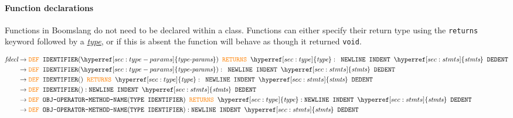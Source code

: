 \documentclass{article}
\begin{document}
\paragraph{Function declarations}
Functions in Boomslang do not need to be declared within a class. Functions can either specify their return type using the \texttt{returns} keyword followed by a \hyperref[sec:type]{\textit{type}}, or if this is absent the function will behave as though it returned \texttt{void}.

\label{sec:fdecl}
\begin{align*}
    \textit{fdecl} &\to \textcolor{orange}{\texttt{DEF}} \texttt{ } \texttt{IDENTIFIER}(\hyperref[sec:type-params]{\textit{type-params}}) \texttt{ } \textcolor{orange}{\texttt{RETURNS}} \texttt{ } \hyperref[sec:type]{\textit{type}}: \texttt{ } \texttt{NEWLINE} \texttt{ } \texttt{INDENT} \texttt{ } \hyperref[sec:stmts]{\textit{stmts}} \texttt{ } \texttt{DEDENT} \\
    &\to \textcolor{orange}{\texttt{DEF}} \texttt{ } \texttt{IDENTIFIER}(\hyperref[sec:type-params]{\textit{type-params}}): \texttt{ } \texttt{NEWLINE} \texttt{ } \texttt{INDENT} \texttt{ } \hyperref[sec:stmts]{\textit{stmts}} \texttt{ } \texttt{DEDENT} \\
    &\to \textcolor{orange}{\texttt{DEF}} \texttt{ } \texttt{IDENTIFIER}() \texttt{ } \textcolor{orange}{\texttt{RETURNS}} \texttt{ } \hyperref[sec:type]{\textit{type}}: \texttt{ } \texttt{NEWLINE} \texttt{ } \texttt{INDENT} \texttt{ } \hyperref[sec:stmts]{\textit{stmts}} \texttt{ } \texttt{DEDENT} \\
    &\to \textcolor{orange}{\texttt{DEF}} \texttt{ } \texttt{IDENTIFIER}(): \texttt{NEWLINE} \texttt{ } \texttt{INDENT} \texttt{ } \hyperref[sec:stmts]{\textit{stmts}} \texttt{ } \texttt{DEDENT} \\
    &\to \textcolor{orange}{\texttt{DEF}} \texttt{ } \texttt{OBJ-OPERATOR-METHOD-NAME}(\texttt{TYPE IDENTIFIER})\texttt{ } \textcolor{orange}{\texttt{RETURNS}} \texttt{ } \hyperref[sec:type]{\textit{type}}: \texttt{NEWLINE} \texttt{ } \texttt{INDENT} \texttt{ } \hyperref[sec:stmts]{\textit{stmts}} \texttt{ } \texttt{DEDENT} \\
    &\to \textcolor{orange}{\texttt{DEF}} \texttt{ } \texttt{OBJ-OPERATOR-METHOD-NAME}(\texttt{TYPE IDENTIFIER}): \texttt{NEWLINE} \texttt{ } \texttt{INDENT} \texttt{ } \hyperref[sec:stmts]{\textit{stmts}} \texttt{ } \texttt{DEDENT} \\
\end{align*}
\end{document}

